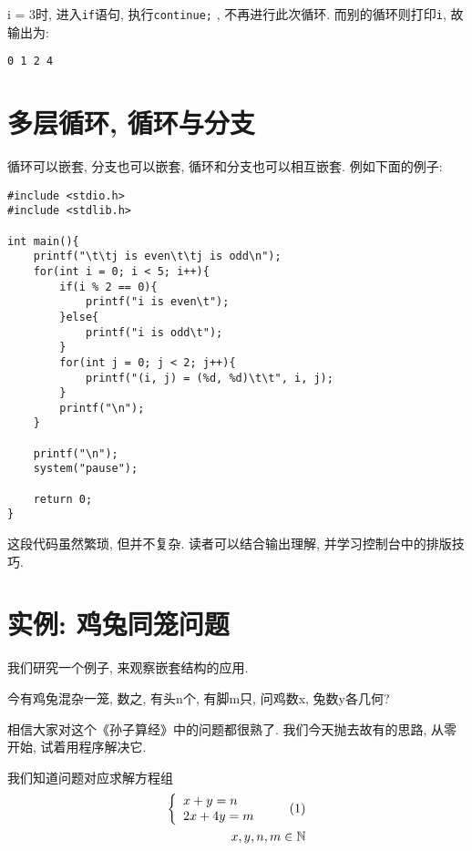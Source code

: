             i = 3时, 进入\texttt{if}语句, 执行\texttt{continue;} , 不再进行此次循环. 而别的循环则打印\texttt{i}, 故输出为:
\begin{lstlisting}
0 1 2 4 
\end{lstlisting}

    \section{多层循环, 循环与分支}
        循环可以嵌套, 分支也可以嵌套, 循环和分支也可以相互嵌套. 例如下面的例子:
\begin{lstlisting}
#include <stdio.h>
#include <stdlib.h>

int main(){
    printf("\t\tj is even\t\tj is odd\n");
    for(int i = 0; i < 5; i++){
        if(i % 2 == 0){
            printf("i is even\t");
        }else{
            printf("i is odd\t");
        }
        for(int j = 0; j < 2; j++){
            printf("(i, j) = (%d, %d)\t\t", i, j);
        }
        printf("\n");
    }

    printf("\n");
    system("pause");

    return 0;
}
\end{lstlisting}

        这段代码虽然繁琐, 但并不复杂. 读者可以结合输出理解, 并学习控制台中的排版技巧.

    \section{实例: 鸡兔同笼问题}
        我们研究一个例子, 来观察嵌套结构的应用.

        \begin{center}
            今有鸡兔混杂一笼, 数之, 有头n个, 有脚m只, 问鸡数x, 兔数y各几何?
        \end{center}

        相信大家对这个《孙子算经》中的问题都很熟了. 我们今天抛去故有的思路, 从零开始, 试着用程序解决它.

        我们知道问题对应求解方程组
        \begin{align}
            \left\{
                \begin{array}{l}
                    x + y = n \\
                    2x + 4y = m
                \end{array}
            \right. \tag{1} \\
            x, y, n, m  \in \mathbb{N}  \notag
        \end{align} \label{鸡兔同笼方程}

